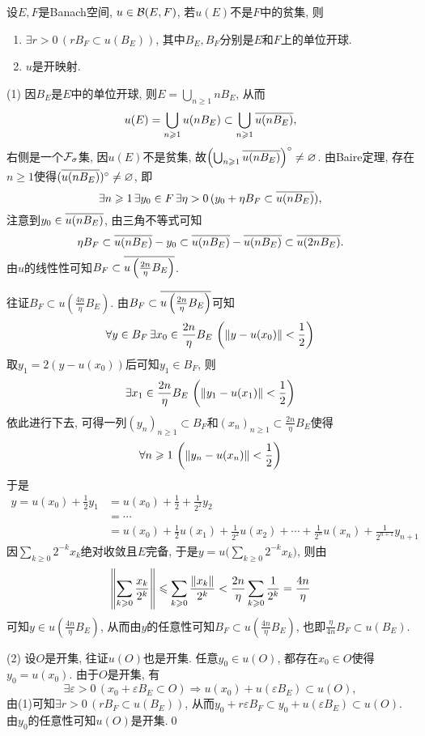 	\begin{Theorem}[开映射定理]\label{thm:开映射定理形式1}
	设$ E, F $是Banach空间, $ u\in\CB(E,F) $, 若$ u(E) $不是$ F $中的贫集, 则
	\begin{enumerate}[(1)]
	\item $ \exists r>0\,(rB_F\subset u(B_E)) $, 其中$ B_E, B_F $分别是$ E $和$ F $上的单位开球.
	\item $ u $是开映射.
	\end{enumerate}
	\end{Theorem}
	\begin{Proof}
	(1) 因$ B_E $是$ E $中的单位开球, 则$ E=\bigcup_{n\geqslant 1}nB_E $, 从而
	\[
	u(E)=\bigcup_{n\geqslant 1}u(nB_E)\subset\bigcup_{n\geqslant 1}\baro{u(nB_E)},
	\]
	右侧是一个$ \Fs $集, 因$ u(E) $不是贫集, 故$ \left(\bigcup_{n\geqslant 1}\baro{u(nB_E)}\right)^\circ\ne\varnothing $. 由Baire定理, 存在$ n\geqslant 1 $使得$ (\baro{u(nB_E)})^\circ\ne\varnothing $, 即
	\[
	\exists n\geqslant 1\,\exists y_0\in F\,\exists\eta>0\,(y_0+\eta B_F\subset \baro{u(nB_E)}),
	\]
	注意到$ y_0\in\baro{u(nB_E)} $, 由三角不等式可知
	\[
	\eta B_F\subset \baro{u(nB_E)}-y_0\subset\baro{u(nB_E)}-\baro{u(nB_E)}\subset\baro{u(2nB_E)}.
	\]
	由$ u $的线性性可知$ B_F\subset \baro{u\left( \frac{2n}{\eta}B_E \right)} $.
	
	往证$ B_F\subset u\left(\frac{4n}{\eta}B_E\right) $. 由$ B_F\subset\baro{u\left( \frac{2n}{\eta}B_E \right)} $可知
	\[
	\forall y\in B_F\,\exists x_0\in\frac{2n}{\eta}B_E\,\left(\norm{y-u(x_0)}<\frac{1}{2}\right)
	\]
	取$ y_1=2(y-u(x_0)) $后可知$ y_1\in B_F $, 则
	\[
	\exists x_1\in\frac{2n}{\eta}B_E\,\left(\norm{y_1-u(x_1)}<\frac{1}{2}\right)
	\]
	依此进行下去, 可得一列$ (y_n)_{n\geqslant 1}\subset B_F $和$ (x_n)_{n\geqslant 1}\subset\frac{2n}{\eta}B_E $使得
	\[
	\forall n\geqslant 1\,\left(\norm{y_n-u(x_n)}<\frac{1}{2}\right)
	\]
	于是
	\[
	\begin{aligned}
	y=u(x_0)+\frac{1}{2}y_1&=u(x_0)+\frac{1}{2}+\frac{1}{2^2}y_2\\
	&=\cdots\\
	&=u(x_0)+\frac{1}{2}u(x_1)+\frac{1}{2^2}u(x_2)+\cdots+\frac{1}{2^n}u(x_n)+\frac{1}{2^{n+1}}y_{n+1}
	\end{aligned}
	\]
	因$ \sum\limits_{k\geqslant 0}2^{-k}x_k $绝对收敛且$ E $完备, 于是$ y=u\Big(\sum\limits_{k\geqslant 0}2^{-k}x_k\Big) $, 则由
	\[
	\norm{\sum_{k\geqslant 0}\frac{x_k}{2^k}}\leqslant\sum_{k\geqslant 0}\frac{\norm{x_k}}{2^k}<\frac{2n}{\eta}\sum_{k\geqslant 0}\frac{1}{2^k}=\frac{4n}{\eta}
	\]
	可知$ y\in u\left(\frac{4n}{\eta}B_E\right) $, 从而由$ y $的任意性可知$ B_F\subset u\left(\frac{4n}{\eta}B_E\right) $, 也即$ \frac{\eta}{4n}B_F\subset u(B_E) $.
	
	(2) 设$ O $是开集, 往证$ u(O) $也是开集. 任意$ y_0\in u(O) $, 都存在$ x_0\in O $使得$ y_0=u(x_0) $. 由于$ O $是开集, 有
	\[
	\exists \varepsilon>0\,(x_0+\varepsilon B_E\subset O)\Longrightarrow u(x_0)+u(\varepsilon B_E)\subset u(O),
	\]
	由(1)可知$ \exists r>0\,(rB_F\subset u(B_E)) $, 从而$ y_0+r\varepsilon B_F\subset y_0+u(\varepsilon B_E)\subset u(O) $. 由$ y_0 $的任意性可知$ u(O) $是开集.\qed
	\end{Proof}
	
